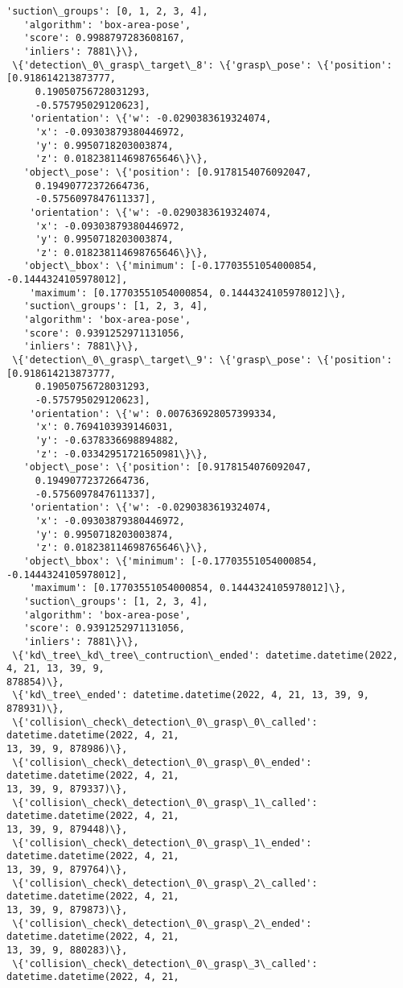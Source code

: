 \documentclass[11pt]{article}
\begin{document}
\begin{tcolorbox}[breakable, size=fbox, boxrule=.5pt, pad at break*=1mm, opacityfill=0]
\begin{Verbatim}[commandchars=\\\{\}]
   'suction\_groups': [0, 1, 2, 3, 4],
   'algorithm': 'box-area-pose',
   'score': 0.9988797283608167,
   'inliers': 7881\}\},
 \{'detection\_0\_grasp\_target\_8': \{'grasp\_pose': \{'position': [0.918614213873777,
     0.19050756728031293,
     -0.575795029120623],
    'orientation': \{'w': -0.0290383619324074,
     'x': -0.09303879380446972,
     'y': 0.9950718203003874,
     'z': 0.018238114698765646\}\},
   'object\_pose': \{'position': [0.9178154076092047,
     0.19490772372664736,
     -0.5756097847611337],
    'orientation': \{'w': -0.0290383619324074,
     'x': -0.09303879380446972,
     'y': 0.9950718203003874,
     'z': 0.018238114698765646\}\},
   'object\_bbox': \{'minimum': [-0.17703551054000854, -0.1444324105978012],
    'maximum': [0.17703551054000854, 0.1444324105978012]\},
   'suction\_groups': [1, 2, 3, 4],
   'algorithm': 'box-area-pose',
   'score': 0.9391252971131056,
   'inliers': 7881\}\},
 \{'detection\_0\_grasp\_target\_9': \{'grasp\_pose': \{'position': [0.918614213873777,
     0.19050756728031293,
     -0.575795029120623],
    'orientation': \{'w': 0.007636928057399334,
     'x': 0.7694103939146031,
     'y': -0.6378336698894882,
     'z': -0.03342951721650981\}\},
   'object\_pose': \{'position': [0.9178154076092047,
     0.19490772372664736,
     -0.5756097847611337],
    'orientation': \{'w': -0.0290383619324074,
     'x': -0.09303879380446972,
     'y': 0.9950718203003874,
     'z': 0.018238114698765646\}\},
   'object\_bbox': \{'minimum': [-0.17703551054000854, -0.1444324105978012],
    'maximum': [0.17703551054000854, 0.1444324105978012]\},
   'suction\_groups': [1, 2, 3, 4],
   'algorithm': 'box-area-pose',
   'score': 0.9391252971131056,
   'inliers': 7881\}\},
 \{'kd\_tree\_kd\_tree\_contruction\_ended': datetime.datetime(2022, 4, 21, 13, 39, 9,
878854)\},
 \{'kd\_tree\_ended': datetime.datetime(2022, 4, 21, 13, 39, 9, 878931)\},
 \{'collision\_check\_detection\_0\_grasp\_0\_called': datetime.datetime(2022, 4, 21,
13, 39, 9, 878986)\},
 \{'collision\_check\_detection\_0\_grasp\_0\_ended': datetime.datetime(2022, 4, 21,
13, 39, 9, 879337)\},
 \{'collision\_check\_detection\_0\_grasp\_1\_called': datetime.datetime(2022, 4, 21,
13, 39, 9, 879448)\},
 \{'collision\_check\_detection\_0\_grasp\_1\_ended': datetime.datetime(2022, 4, 21,
13, 39, 9, 879764)\},
 \{'collision\_check\_detection\_0\_grasp\_2\_called': datetime.datetime(2022, 4, 21,
13, 39, 9, 879873)\},
 \{'collision\_check\_detection\_0\_grasp\_2\_ended': datetime.datetime(2022, 4, 21,
13, 39, 9, 880283)\},
 \{'collision\_check\_detection\_0\_grasp\_3\_called': datetime.datetime(2022, 4, 21,

\end{Verbatim}
\end{tcolorbox}
\end{document}
